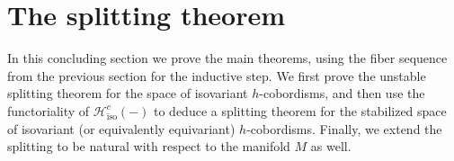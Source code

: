 \documentclass[11pt]{amsart}
\theoremstyle{definition}
\newtheorem{notn}{Notation}[section]
\numberwithin{equation}{section}
\numberwithin{figure}{section}
\newcommand{\mc}{\mathcal}
\newcommand{\iso}{\mathrm{iso}}
\begin{document}
\section{The splitting theorem}\label{sec:splitting}

In this concluding section we prove the main theorems, using the fiber sequence from the previous section for the inductive step. We first prove the unstable splitting theorem for the space of isovariant $h$-cobordisms, and then use the functoriality of $\mc H_\iso^c(-)$ to deduce a splitting theorem for the stabilized space of isovariant (or equivalently equivariant) $h$-cobordisms. Finally, we extend the splitting to be natural with respect to the manifold $M$ as well.


%
%
%
%
\end{document}
